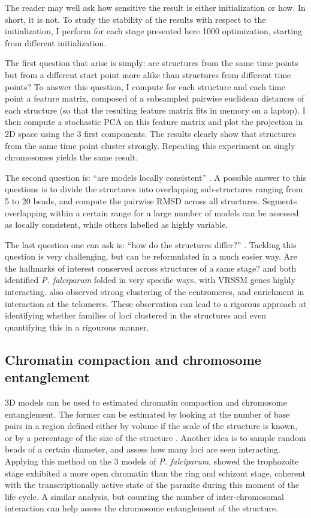 \documentclass[2columns]{article}
\begin{document}
The reader may well ask how sensitive the result is either initialization or
how. In short, it is not. To study the stability of the results with respect
to the initialization, I perform for each stage presented here 1000
optimization, starting from different initialization. 

The first question that arise is simply: are structures from the same time
points but from a different start point more alike than structures from
different time points? To answer this question, I compute for each structure
and each time point a feature matrix, composed of a subsampled pairwise
euclidean distances of each structure (so that the resulting feature matrix
fits in memory on a laptop). I then compute a stochastic PCA on this feature
matrix and plot the projection in 2D space using the 3 first components. The
results clearly show that structures from the same time point cluster
strongly. Repeating this experiment on singly chromosomes yields the same
result.

The second question is: ``are models locally consistent''
\citep{bau:three-dimensional}. A possible answer to this questions is to
divide the structures into overlapping sub-structures ranging from 5 to 20
beads, and compute the pairwise RMSD across all structures. Segments
overlapping within a certain range for a large number of models can be
assessed as locally consistent, while others labelled as highly variable.

The last question one can ask is: ``how do the structures differ?'' . Tackling
this question is very challenging, but can be reformulated in a much easier
way. Are the hallmarks of interest conserved across structures of a same
stage? \citet{ay:three-dimensional} and \citet{lemieux:genome-wide} both
identified {\em P. falciparum} folded in very specific ways, with VRSSM genes
highly interacting. \citet{ay:three-dimensional} also observed strong
clustering of the centromeres, and enrichment in interaction at the telomeres.
These observation can lead to a rigorous approach at identifying whether
families of loci clustered in the structures and even quantifying this in a
rigourous manner.

\subsection*{Chromatin compaction and chromosome entanglement}

3D models can be used to estimated chromatin compaction and chromosome
entanglement. The former can be estimated by looking at the number of base
pairs in a region defined either by volume if the scale of the structure is
known, or by a percentage of the size of the structure
\citep{bau:three-dimensional}. Another idea is to sample random beads of a
certain diameter, and assess how many loci are seen interacting. Applying this
method on the 3 models of {\em P. falciparum}, \citet{ay:three-dimensional}
showed the trophozoite stage exhibited a more open chromatin than the ring and
schizont stage, coherent with the transcriptionally active state of the
parazite during this moment of the life cycle. A similar analysis, but
counting the number of inter-chromosomal interaction can help assess the
chromosome entanglement of the structure.
\end{document}
